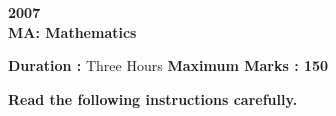\documentclass{article}
\begin{document}
\begin{center}
    \textbf{2007} \\
        \vspace{1em}
	    {\LARGE \textbf{MA: Mathematics}}
	    \end{center}

	    \vspace{1em}

	    \textbf{Duration :} Three Hours \hfill \textbf{Maximum Marks : 150}

	    \vspace{2em}

	    \begin{center}
	        \textbf{Read the following instructions carefully.}
		\end{center}

		\vspace{1em}
\end{document}
